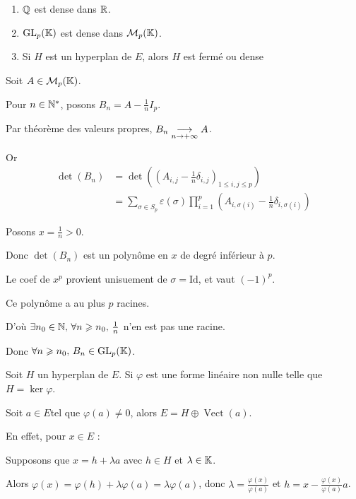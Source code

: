 \begin{exemple}
    \begin{enumerate}
        \item $\mathbb{Q}$ est dense dans $\mathbb{R}$.
        \item $\operatorname{GL}_p(\mathbb{K})$ est dense dans $\mathcal M_p(\mathbb{K})$.
        \item Si $H$ est un hyperplan de $E$, alors $H$ est fermé ou dense
    \end{enumerate}



    \svspace Soit $A \in \mathcal M_p(\mathbb{K})$.

    Pour $n \in \mathbb{N}^*$, posons $B_n = A - \frac 1 n I_p$.

    Par théorème des valeurs propres, $B_n \underset{n \to + \infty}{\longrightarrow} A$.

    Or 
    \begin{align*}
        \det(B_n) & = \det((A_{i, j} - \frac 1 n \delta_{i, j})_{1 \leqslant i, j \leqslant p}) \\
        & = \sum_{ \sigma \in S_p} \varepsilon(\sigma) \prod_{i=1}^p (A_{i, \sigma(i)} - \frac 1 n \delta_{i, \sigma(i)}) 
    \end{align*}

    Posons $x = \frac 1 n > 0$. 

    Donc $\det(B_n) $ est un polynôme en $x$ de degré inférieur à $p$. 

    Le coef de $x^p$ provient unisuement de $\sigma = \text{Id}$, et vaut $(-1)^p$.

    Ce polynôme a au plus $p$ racines. 

    D'où $\exists n_0 \in \mathbb{N}, \, \forall n \geqslant n_0, \, \frac 1 n$ n'en est pas une racine. 

    Donc $\forall n \geqslant n_0, \, B_n \in \operatorname{GL}_p(\mathbb{K})$.



    \svspace Soit $H$ un hyperplan de $E$. Si $\varphi$ est une forme linéaire non nulle
    telle que $H = \ker \varphi$.

    Soit $a \in E $tel que $\varphi(a) \neq 0$, alors $E = H \oplus \operatorname{Vect}(a)$.

    En effet, pour $x \in E$ : 
    

    \svspace Supposons que $x = h + \lambda a$ avec $h \in H$ et $\lambda \in \mathbb{K}$.

    Alors $\varphi(x) = \varphi(h) + \lambda \varphi(a) = \lambda \varphi(a)$, donc
    $\lambda = \frac{\varphi(x)}{\varphi(a)}$ et $h = x - \frac{\varphi(x)}{\varphi(a)} a$.


\end{exemple}
